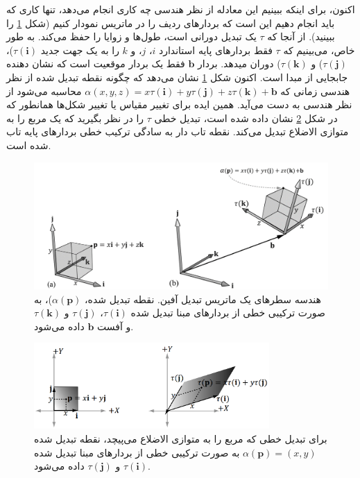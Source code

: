 {\begin{spacing}{1.5}
        اکنون، برای اینکه ببینیم این معادله از نظر هندسی چه کاری انجام می‌دهد، تنها کاری که باید انجام دهیم این است که بردارهای ردیف را در ماتریس نمودار کنیم (شکل \ref{fig:4.Session.1.3.7} را ببینید).
        از آنجا که $\tau$ یک تبدیل دورانی است، طول‌ها و زوایا را حفظ می‌کند.
        به طور خاص، می‌بینیم که $\tau$ فقط بردارهای پایه استاندارد $i$، $j$، و $k$ را به یک جهت جدید $\tau(\textbf{i})$)، $\tau(\textbf{j})$) و $\tau(\textbf{k})$) دوران میدهد.
        بردار $\textbf{b}$ فقط یک بردار موقعیت است که نشان دهنده جابجایی از مبدا است.
        اکنون شکل \ref{fig:4.Session.1.3.7} نشان می‌دهد که چگونه نقطه تبدیل شده از نظر هندسی زمانی که $\alpha(x,y,z)=x\tau(\textbf{i})+y\tau(\textbf{j})+z\tau(\textbf{k})+\textbf{b}$ محاسبه می‌شود از نظر هندسی به دست می‌آید.
        همین ایده برای تغییر مقیاس یا تغییر شکل‌ها همانطور که در شکل \ref{fig:4.Session.1.3.8} نشان داده شده است،
        تبدیل خطی $\tau$ را در نظر بگیرید که یک مربع را به متوازی الاضلاع تبدیل می‌کند.
        نقطه تاب دار به سادگی ترکیب خطی بردارهای پایه تاب شده است.

        \begin{figure}[H]
            \centering
            \setlength{\belowcaptionskip}{-10pt}
            \includegraphics[width=\textwidth]{Images/4/3/4.Session.1.3.7}
            \caption {هندسه سطرهای یک ماتریس تبدیل آفین. نقطه تبدیل شده، $\alpha(\textbf{p})$)، به صورت ترکیبی خطی از بردارهای مبنا تبدیل شده $\tau(\textbf{i})$، $\tau(\textbf{j})$ و $\tau(\textbf{k})$ و آفست $\textbf{b}$ داده می‌شود.}
            \label{fig:4.Session.1.3.7}
        \end{figure}

        \begin{figure}[H]
            \centering
            \setlength{\belowcaptionskip}{-10pt}
            \includegraphics[width=0.8\textwidth]{Images/4/3/4.Session.1.3.8}
            \caption {برای تبدیل خطی که مربع را به متوازی الاضلاع می‌پیچد، نقطه تبدیل شده $\alpha(\textbf{p})=(x,y)$ به صورت ترکیبی خطی از بردارهای مبنا تبدیل شده $\tau(\textbf{i})$ و $\tau(\textbf{j})$ داده می‌شود.}
            \label{fig:4.Session.1.3.8}
        \end{figure}
    \end{spacing}
}


